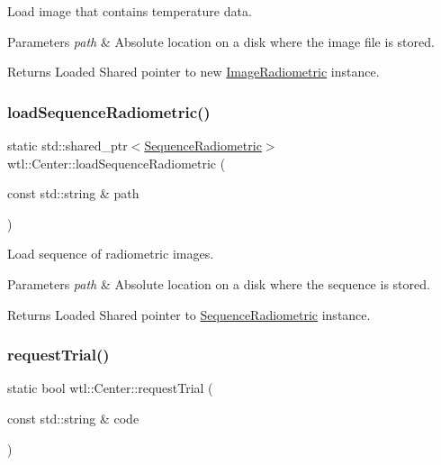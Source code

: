 Load image that contains temperature data. 


\begin{DoxyParams}{Parameters}
{\em path} & Absolute location on a disk where the image file is stored. \\
\hline
\end{DoxyParams}
\begin{DoxyReturn}{Returns}
Loaded Shared pointer to new \hyperlink{classwtl_1_1_image_radiometric}{Image\+Radiometric} instance. 
\end{DoxyReturn}
\mbox{\label{classwtl_1_1_center_aaf1b3d48079c2379413b3646914850a1}} 
\subsubsection{\texorpdfstring{load\+Sequence\+Radiometric()}{loadSequenceRadiometric()}}
{\footnotesize\ttfamily static std\+::shared\+\_\+ptr$<$\hyperlink{classwtl_1_1_sequence_radiometric}{Sequence\+Radiometric}$>$ wtl\+::\+Center\+::load\+Sequence\+Radiometric (\begin{DoxyParamCaption}\item[{const std\+::string \&}]{path }\end{DoxyParamCaption})\hspace{0.3cm}{\ttfamily [static]}}



Load sequence of radiometric images. 


\begin{DoxyParams}{Parameters}
{\em path} & Absolute location on a disk where the sequence is stored. \\
\hline
\end{DoxyParams}
\begin{DoxyReturn}{Returns}
Loaded Shared pointer to \hyperlink{classwtl_1_1_sequence_radiometric}{Sequence\+Radiometric} instance. 
\end{DoxyReturn}
\mbox{\label{classwtl_1_1_center_ab8831fd0255ae72ee48644cdb571e78d}} 
\subsubsection{\texorpdfstring{request\+Trial()}{requestTrial()}}
{\footnotesize\ttfamily static bool wtl\+::\+Center\+::request\+Trial (\begin{DoxyParamCaption}\item[{const std\+::string \&}]{code }\end{DoxyParamCaption})\hspace{0.3cm}{\ttfamily [static]}}



